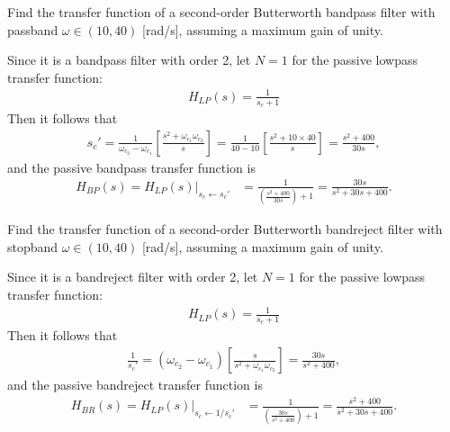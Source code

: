 \documentclass{report}
\begin{document}
\begin{example}
    Find the transfer function of a second-order Butterworth bandpass filter with passband $\omega\in(10,40)$ [rad/s], assuming a maximum gain of unity.
\end{example}
\begin{solution}
    Since it is a bandpass filter with order 2, let $N=1$ for the passive lowpass transfer function:
    \begin{align*}
        H_{LP}(s) = \frac{1}{s_c+1}
    \end{align*}
    Then it follows that 
    \begin{align*}
        s_c' = \frac{1}{\omega_{c_2}-\omega_{c_1}}\left[\frac{s^2+\omega_{c_1}\omega_{c_2}}{s}\right] = \frac{1}{40-10}\left[\frac{s^2+10\times 40}{s}\right] = \frac{s^2+400}{30s},
    \end{align*}
    and the passive bandpass transfer function is
    \begin{align*}
        H_{BP}(s) = H_{LP}(s)\bigg|_{s_c\leftarrow s_c'} &= \frac{1}{\left(\frac{s^2+400}{30s}\right)+1} = \frac{30s}{s^2+30s+400}. 
    \end{align*}
\end{solution}
\begin{example}
    Find the transfer function of a second-order Butterworth bandreject filter with stopband $\omega\in(10,40)$ [rad/s], assuming a maximum gain of unity.
\end{example}
\begin{solution}
    Since it is a bandreject filter with order 2, let $N=1$ for the passive lowpass transfer function:
    \begin{align*}
        H_{LP}(s) = \frac{1}{s_c+1}
    \end{align*}
    Then it follows that 
    \begin{align*}
        \frac{1}{s_c'} = (\omega_{c_2}-\omega_{c_1})\left[\frac{s}{s^2+\omega_{c_1}\omega_{c_2}}\right] = \frac{30s}{s^2+400},
    \end{align*}
    and the passive bandreject transfer function is
    \begin{align*}
        H_{BR}(s) = H_{LP}(s)\bigg|_{s_c\leftarrow 1/s_c'} &= \frac{1}{\left(\frac{30s}{s^2+400}\right)+1} = \frac{s^2+400}{s^2+30s+400}. 
    \end{align*}
\end{solution}
\end{document}
